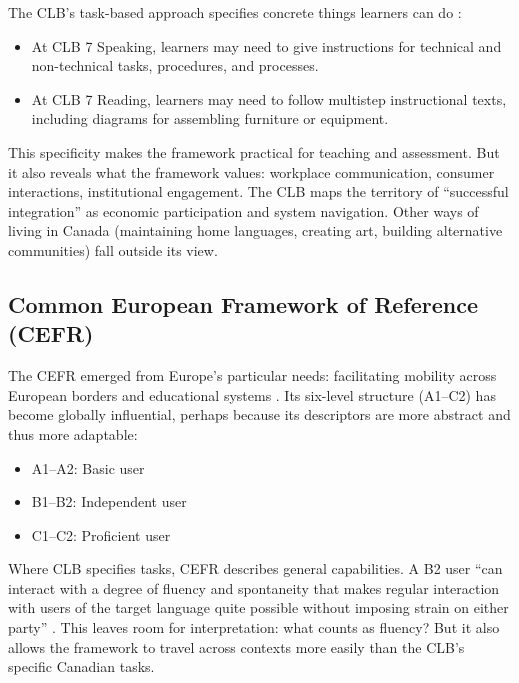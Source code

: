 The CLB's task-based approach specifies concrete things learners can do \citep[81, 117]{CCLB2012}:

\begin{itemize}[noitemsep]
    \item At CLB 7 Speaking, learners may need to give instructions for technical and non-technical tasks, procedures, and processes.
    \item At CLB 7 Reading, learners may need to follow multistep instructional texts, including diagrams for assembling furniture or equipment.
\end{itemize}

This specificity makes the framework practical for teaching and assessment. But it also reveals what the framework values: workplace communication, consumer interactions, institutional engagement. The CLB maps the territory of \enquote{successful integration} as economic participation and system navigation. Other ways of living in Canada (maintaining home languages, creating art, building alternative communities) fall outside its view.

\subsection{Common European Framework of Reference (CEFR)}

The CEFR emerged from Europe's particular needs: facilitating mobility across European borders and educational systems \citep{CouncilOfEurope2020}. Its six-level structure (A1--C2) has become globally influential, perhaps because its descriptors are more abstract and thus more adaptable:

\begin{itemize}[noitemsep]
\item A1--A2: Basic user
\item B1--B2: Independent user
\item C1--C2: Proficient user
\end{itemize}

Where CLB specifies tasks, CEFR describes general capabilities. A B2 user \enquote{can interact with a degree of fluency and spontaneity that makes regular interaction with users of the target language quite possible without imposing strain on either party} \citep[174]{CouncilOfEurope2020}. This leaves room for interpretation: what counts as fluency? But it also allows the framework to travel across contexts more easily than the CLB's specific Canadian tasks.

